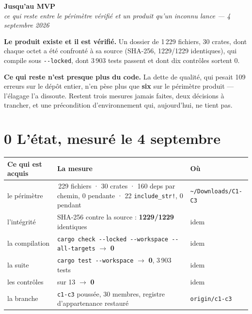 \documentclass[11pt]{article}
\newcommand{\code}[1]{\texttt{\small #1}}
\newcommand{\best}[1]{{\color{efesolve}\textbf{#1}}}
\newcommand{\fl}{$\rightarrow$}
\begin{document}
\begin{center}
{\Huge\bfseries\color{efenavy} Jusqu'au MVP}\\[3pt]
{\large\color{efegray}\itshape ce qui reste entre le périmètre vérifié et un produit qu'un inconnu lance --- 4 septembre 2026}
\end{center}
\vspace{2pt}

\begin{these}
\textbf{Le produit existe et il est vérifié.} Un dossier de 1\,229 fichiers, 30 crates, dont chaque
octet a été confronté à sa source (SHA-256, 1229/1229 identiques), qui compile sous
\code{-{}-locked}, dont 3\,903 tests passent et dont dix contrôles sortent 0.

\textbf{Ce qui reste n'est presque plus du code.} La dette de qualité, qui pesait 109 erreurs sur
le dépôt entier, n'en pèse plus que \best{six} sur le périmètre produit --- l'élagage l'a
dissoute. Restent trois mesures jamais faites, deux décisions à trancher, et une précondition
d'environnement qui, aujourd'hui, ne tient pas.
\end{these}

\section{0 \;\textbar\; L'état, mesuré le 4 septembre}

\begin{center}\small
\renewcommand{\arraystretch}{1.25}
\begin{tabular}{@{}>{\raggedright\arraybackslash}p{5.3cm} >{\raggedright\arraybackslash}p{6.4cm} >{\raggedright\arraybackslash}p{4.4cm}@{}}
\toprule
\textbf{Ce qui est acquis} & \textbf{La mesure} & \textbf{Où} \\
\midrule
le périmètre & 1\,229 fichiers · 30 crates · 160 deps par chemin, 0 pendante · 22 \code{include\_str!}, 0 pendant & \code{\textasciitilde/Downloads/C1-C3} \\
l'intégrité & SHA-256 contre la source : \best{1229/1229} identiques & idem \\
la compilation & \code{cargo check -{}-locked -{}-workspace -{}-all-targets} \fl{} \best{0} & idem \\
la suite & \code{cargo test -{}-workspace} \fl{} \best{0}, 3\,903 tests & idem \\
les contrôles & 10 sur 13 \fl{} \best{0} & idem \\
la branche & \code{c1-c3} poussée, 30 membres, registre d'appartenance restauré & \code{origin/c1-c3} \\
\bottomrule
\end{tabular}
\end{center}
\end{document}
